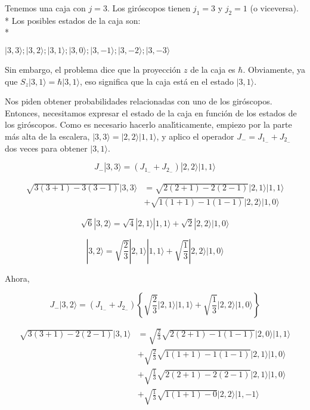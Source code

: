   \begin{solution}
    \begin{parts}
      \item Tenemos una caja con $j=3$. Los giróscopos tienen $j_1=3$ y $j_2=1$ (o viceversa).\\*
      Los posibles estados de la caja son:\\*
     \begin{doublespace}
  \(|3,3\rangle ; |3,2\rangle ; |3,1\rangle ; |3,0\rangle ; |3,-1\rangle ; |3,-2\rangle ; |3,-3\rangle \)
  \end{doublespace}
  
  Sin embargo, el problema dice que la proyecci{\' o}n \(z\) de la caja es $\hbar $. Obviamente, ya que { }\(S_z|3,1\rangle = \hbar  |3,1\rangle\),
  eso significa que la caja est{\' a} en el estado \(|3,1\rangle\).
  
  Nos piden obtener probabilidades relacionadas con uno de los gir{\' o}scopos. Entonces, necesitamos expresar el estado de la caja en funci{\' o}n
  de los estados de los gir{\' o}scopos. Como es necesario hacerlo anal{\' \i}ticamente, empiezo por la parte m{\' a}s alta de la escalera, \(|3,3\rangle
  =|2,2\rangle |1,1\rangle\), y aplico el operador \(J_-=J_{1_-}+J_{2_-}\) dos veces para obtener \(|3,1\rangle\).
  
  \[J_-|3,3\rangle =\left(J_{1_-}+J_{2_-}\right)|2,2\rangle |1,1\rangle\]
  
  \begin{align*}
       \sqrt{3(3+1)-3(3-1)}|3,3\rangle &=\sqrt{2(2+1)-2(2-1)}|2,1\rangle |1,1\rangle \\
  &+\sqrt{1(1+1)-1(1-1)}|2,2\rangle |1,0\rangle\
  \end{align*}
  
  \[\sqrt{6}|3,2\rangle =\sqrt{4}|2,1\rangle |1,1\rangle +\sqrt{2}|2,2\rangle |1,0\rangle\]
  
  \[|3,2\rangle =\sqrt{\frac{2}{3}}|2,1\rangle |1,1\rangle +\sqrt{\frac{1}{3}}|2,2\rangle |1,0\rangle\]
  
  Ahora,
  
  \[J_-|3,2\rangle =\left(J_{1_-}+J_{2_-}\right)\left\{\sqrt{\frac{2}{3}}|2,1\rangle |1,1\rangle +\sqrt{\frac{1}{3}}|2,2\rangle |1,0\rangle \right\}\]
  
  \begin{align*}
      \sqrt{3(3+1)-2(2-1)}|3,1\rangle &=\sqrt{\frac{2}{3}}\sqrt{2(2+1)-1(1-1)}|2,0\rangle |1,1\rangle \\ &+\sqrt{\frac{2}{3}}\sqrt{1(1+1)-1(1-1)}|2,1\rangle|1,0\rangle \\
     &+\sqrt{\frac{1}{3}}\sqrt{2(2+1)-2(2-1)}|2,1\rangle |1,0\rangle \\
      &+\sqrt{\frac{1}{3}}\sqrt{1(1+1)-0}|2,2\rangle |1,-1\rangle
  \end{align*}
  

\end{parts}
\end{solution}
